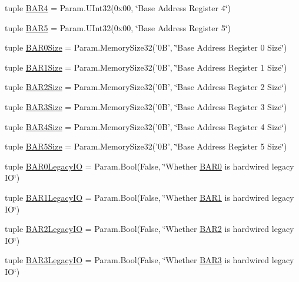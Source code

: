 \begin{DoxyCompactItemize}
\item 
tuple \hyperlink{classPci_1_1PciDevice_a50a34d2b9855ad231f8b6dab39c0641a}{BAR4} = Param.UInt32(0x00, \char`\"{}Base Address Register 4\char`\"{})
\item 
tuple \hyperlink{classPci_1_1PciDevice_a9bc605ff9fcc9424477afc81fa73422e}{BAR5} = Param.UInt32(0x00, \char`\"{}Base Address Register 5\char`\"{})
\item 
tuple \hyperlink{classPci_1_1PciDevice_a7e828d882d67741a4bb003f243f67930}{BAR0Size} = Param.MemorySize32('0B', \char`\"{}Base Address Register 0 Size\char`\"{})
\item 
tuple \hyperlink{classPci_1_1PciDevice_a17a8d09c6d1486c3ecfd0f013a6d5dc2}{BAR1Size} = Param.MemorySize32('0B', \char`\"{}Base Address Register 1 Size\char`\"{})
\item 
tuple \hyperlink{classPci_1_1PciDevice_a0643ce9d16353fc911871eb320aa2eae}{BAR2Size} = Param.MemorySize32('0B', \char`\"{}Base Address Register 2 Size\char`\"{})
\item 
tuple \hyperlink{classPci_1_1PciDevice_ae04afc140f2d94d97e67855d3ddffe3e}{BAR3Size} = Param.MemorySize32('0B', \char`\"{}Base Address Register 3 Size\char`\"{})
\item 
tuple \hyperlink{classPci_1_1PciDevice_ae076d620ed7c44d0096275df67e922e6}{BAR4Size} = Param.MemorySize32('0B', \char`\"{}Base Address Register 4 Size\char`\"{})
\item 
tuple \hyperlink{classPci_1_1PciDevice_ac4c34d8860543ffbe7a01a270d2b78b5}{BAR5Size} = Param.MemorySize32('0B', \char`\"{}Base Address Register 5 Size\char`\"{})
\item 
tuple \hyperlink{classPci_1_1PciDevice_a32603a049ed92aee1ac0903a3290de9a}{BAR0LegacyIO} = Param.Bool(False, \char`\"{}Whether \hyperlink{classPci_1_1PciDevice_a60fb126d4d1fa61ee963a802485a62b3}{BAR0} is hardwired legacy IO\char`\"{})
\item 
tuple \hyperlink{classPci_1_1PciDevice_ad6224e7996cf1129f5001f1c99d88f2d}{BAR1LegacyIO} = Param.Bool(False, \char`\"{}Whether \hyperlink{classPci_1_1PciDevice_ac14577636d310ffbce9d3e1c55071930}{BAR1} is hardwired legacy IO\char`\"{})
\item 
tuple \hyperlink{classPci_1_1PciDevice_a28ad4ed046bf6992ae20784445248de3}{BAR2LegacyIO} = Param.Bool(False, \char`\"{}Whether \hyperlink{classPci_1_1PciDevice_a50e0986fba3f6efbdbb66dea13ac4813}{BAR2} is hardwired legacy IO\char`\"{})
\item 
tuple \hyperlink{classPci_1_1PciDevice_a9b177ee7fb609f562787c06b9c0bef3e}{BAR3LegacyIO} = Param.Bool(False, \char`\"{}Whether \hyperlink{classPci_1_1PciDevice_a8d29325a3868fc855f430913941a20b8}{BAR3} is hardwired legacy IO\char`\"{})

\end{DoxyCompactItemize}
